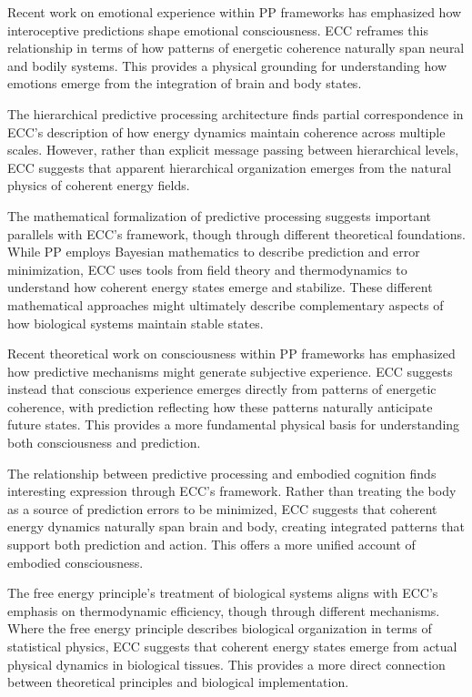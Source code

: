 Recent work on emotional experience within PP frameworks \cite{Seth2012} has emphasized how interoceptive predictions shape emotional consciousness. ECC reframes this relationship in terms of how patterns of energetic coherence naturally span neural and bodily systems. This provides a physical grounding for understanding how emotions emerge from the integration of brain and body states.

The hierarchical predictive processing architecture \cite{Clark2013} finds partial correspondence in ECC's description of how energy dynamics maintain coherence across multiple scales. However, rather than explicit message passing between hierarchical levels, ECC suggests that apparent hierarchical organization emerges from the natural physics of coherent energy fields.

The mathematical formalization of predictive processing \cite{Friston2009} suggests important parallels with ECC's framework, though through different theoretical foundations. While PP employs Bayesian mathematics to describe prediction and error minimization, ECC uses tools from field theory and thermodynamics to understand how coherent energy states emerge and stabilize. These different mathematical approaches might ultimately describe complementary aspects of how biological systems maintain stable states.

Recent theoretical work on consciousness within PP frameworks \cite{Seth2016} has emphasized how predictive mechanisms might generate subjective experience. ECC suggests instead that conscious experience emerges directly from patterns of energetic coherence, with prediction reflecting how these patterns naturally anticipate future states. This provides a more fundamental physical basis for understanding both consciousness and prediction.

The relationship between predictive processing and embodied cognition \cite{Clark2016} finds interesting expression through ECC's framework. Rather than treating the body as a source of prediction errors to be minimized, ECC suggests that coherent energy dynamics naturally span brain and body, creating integrated patterns that support both prediction and action. This offers a more unified account of embodied consciousness.

The free energy principle's treatment of biological systems \cite{Friston2010} aligns with ECC's emphasis on thermodynamic efficiency, though through different mechanisms. Where the free energy principle describes biological organization in terms of statistical physics, ECC suggests that coherent energy states emerge from actual physical dynamics in biological tissues. This provides a more direct connection between theoretical principles and biological implementation.

